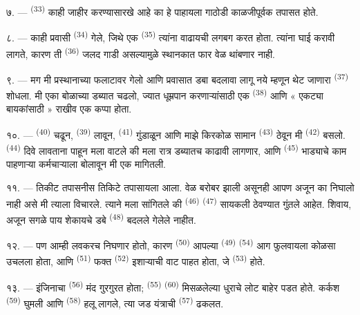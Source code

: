 ७. ---  \textsuperscript{(33)} काही जाहीर करण्यासारखे आहे का हे पाहायला
गाठोडी काळजीपूर्वक तपासत होते.

८. --- काही प्रवासी  \textsuperscript{(34)} गेले, जिथे एक 
\textsuperscript{(35)} त्यांना वाढायची लगबग करत होता. त्यांना घाई करावी लागते, कारण ती
 \textsuperscript{(36)} जलद गाडी असल्यामुळे स्थानकात फार वेळ थांबणार नाही.

९. --- मग मी प्रस्थानाच्या फलाटावर गेलो आणि प्रवासात डबा बदलावा लागू नये म्हणून थेट जाणारा
 \textsuperscript{(37)} शोधला. मी एका बोळाच्या डब्यात चढलो, ज्यात धूम्रपान
करणाऱ्यांसाठी एक  \textsuperscript{(38)} आणि « एकट्या बायकांसाठी » राखीव एक
कप्पा होता.

\VUsaut{3.0mm}

१०. ---  \textsuperscript{(40)} चढून,  \textsuperscript{(39)} लावून,
 \textsuperscript{(41)} गुंडाळून आणि माझे किरकोळ सामान 
\textsuperscript{(43)} ठेवून मी  \textsuperscript{(42)} बसलो.
 \textsuperscript{(44)} दिवे लावताना पाहून मला वाटले की मला रात्र डब्यातच
काढावी लागणार, आणि  \textsuperscript{(45)} भाड्याचे काम पाहणाऱ्या
कर्मचाऱ्याला बोलावून मी एक मागितली.

११. --- तिकीट तपासनीस तिकिटे तपासायला आला. वेळ बरोबर झाली असूनही आपण अजून का निघालो नाही असे
मी त्याला विचारले. त्याने मला सांगितले की  \textsuperscript{(46)}
 \textsuperscript{(47)} सायकली ठेवण्यात गुंतले आहेत. शिवाय, अजून
सगळे पाय शेकायचे डबे \textsuperscript{(48)} बदलले गेलेले नाहीत.

१२. --- पण आम्ही लवकरच निघणार होतो, कारण  \textsuperscript{(50)}
आपल्या  \textsuperscript{(49)} 
\textsuperscript{(54)} आग फुलवायला कोळसा उचलला होता, आणि 
\textsuperscript{(51)} फक्त  \textsuperscript{(52)}
इशाऱ्याची वाट पाहत होता, जे  \textsuperscript{(53)} होते.

१३. --- इंजिनाचा  \textsuperscript{(56)} मंद गुरगुरत होता; 
\textsuperscript{(55)}  \textsuperscript{(60)} मिसळलेल्या धुराचे लोट बाहेर पडत
होते. कर्कश  \textsuperscript{(59)} घुमली आणि 
\textsuperscript{(58)} हलू लागले, त्या जड यंत्राची  \textsuperscript{(57)} ढकलत.

